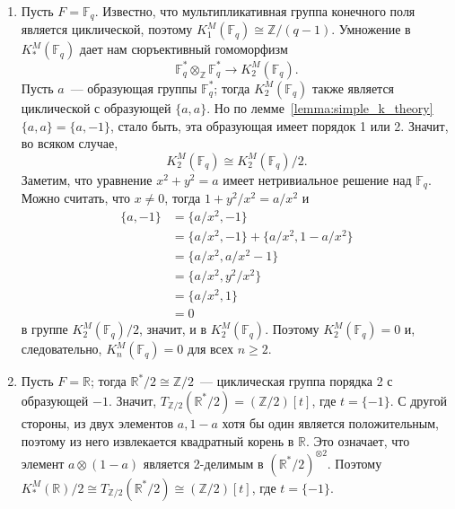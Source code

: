 \documentclass[a4paper,oneside,12pt]{article}
\theoremstyle{plain} { \swapnumbers
\newtheorem{theorem}{Теорема}[subsection]
\newtheorem{corollary}[theorem]{Следствие}
\newtheorem{lemma}[theorem]{Лемма}
\newtheorem{proposition}[theorem]{Утверждение}
\newtheorem{claim}[theorem]{Факт}
}
\theoremstyle{definition} { \swapnumbers
\newtheorem{definition}[theorem]{Определение}
\newtheorem{notation}[theorem]{Обозначение}
\newtheorem{remark}[theorem]{Замечание}
\newtheorem{remarks}[theorem]{Замечания}
\newtheorem{example}[theorem]{Пример}
\newtheorem{examples}[theorem]{Примеры}
\newtheorem{sssection}[theorem]{}
}
\begin{document}
\begin{examples}
\begin{enumerate}
\item Пусть $F=\mathbb F_q$. Известно, что мультипликативная группа конечного поля является
циклической, поэтому $K_1^M(\mathbb F_q)\cong\mathbb Z/(q-1)$. Умножение в $K_*^M(\mathbb F_q)$
дает нам сюръективный гомоморфизм
$$
\mathbb F_q^*\otimes_{\mathbb Z}\mathbb F_q^*\to K_2^M(\mathbb F_q).
$$
Пусть $a$~--- образующая группы $\mathbb F_q^*$; тогда $K_2^M(\mathbb F_q)$ также является
циклической с образующей $\{a,a\}$. Но по лемме~\ref{lemma:simple_k_theory} $\{a,a\}=\{a,-1\}$,
стало быть, эта образующая имеет порядок 1 или 2. Значит, во всяком случае,
$$
K_2^M(\mathbb F_q)\cong K_2^M(\mathbb F_q)/2.
$$
Заметим, что уравнение $x^2+y^2=a$ имеет нетривиальное решение над $\mathbb F_q$. Можно считать,
что $x\neq 0$, тогда $1+y^2/x^2=a/x^2$ и
$$
\begin{aligned}
\{a,-1\}&=\{a/x^2,-1\}\\
&=\{a/x^2,-1\}+\{a/x^2,1-a/x^2\}\\
&=\{a/x^2,a/x^2-1\}\\
&=\{a/x^2,y^2/x^2\}\\
&=\{a/x^2,1\}\\
&=0
\end{aligned}
$$
в группе $K_2^M(\mathbb F_q)/2$, значит, и в $K_2^M(\mathbb F_q)$. Поэтому $K_2^M(\mathbb F_q)=0$
и, следовательно, $K_n^M(\mathbb F_q)=0$ для всех $n\geq 2$.
\item Пусть $F=\mathbb R$; тогда $\mathbb R^*/2\cong\mathbb Z/2$~--- циклическая группа порядка 2
с образующей $-1$. Значит, $T_{\mathbb Z/2}(\mathbb R^*/2)=(\mathbb Z/2)[t]$, где $t=\{-1\}$.
С другой стороны, из двух элементов $a,1-a$ хотя бы один является положительным, поэтому из него
извлекается квадратный корень в $\mathbb R$. Это означает, что элемент
$a\otimes(1-a)$ является 2-делимым в $(\mathbb R^*/2)^{\otimes 2}$.
Поэтому $K_*^M(\mathbb R)/2\cong T_{\mathbb Z/2}(\mathbb R^*/2)\cong(\mathbb Z/2)[t]$, где $t=\{-1\}$.
\end{enumerate}
\end{examples}
\end{document}
